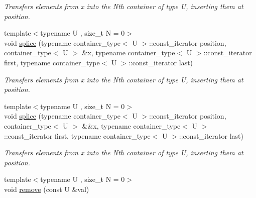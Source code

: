 \begin{DoxyCompactItemize}
\begin{DoxyCompactList}\small\item\em Transfers elements from x into the Nth container of type U, inserting them at position. \end{DoxyCompactList}\item 
\hypertarget{classheterogeneous_1_1heterolist_3_01_t_00_01_types_8_8_8_4_a9c8929311e56974b00402dace18f0bab}{}{\footnotesize template$<$typename U , size\+\_\+t N = 0$>$ }\\void \hyperlink{classheterogeneous_1_1heterolist_3_01_t_00_01_types_8_8_8_4_a9c8929311e56974b00402dace18f0bab}{splice} (typename container\+\_\+type$<$ U $>$\+::const\+\_\+iterator position, container\+\_\+type$<$ U $>$ \&x, typename container\+\_\+type$<$ U $>$\+::const\+\_\+iterator first, typename container\+\_\+type$<$ U $>$\+::const\+\_\+iterator last)\label{classheterogeneous_1_1heterolist_3_01_t_00_01_types_8_8_8_4_a9c8929311e56974b00402dace18f0bab}

\begin{DoxyCompactList}\small\item\em Transfers elements from x into the Nth container of type U, inserting them at position. \end{DoxyCompactList}\item 
\hypertarget{classheterogeneous_1_1heterolist_3_01_t_00_01_types_8_8_8_4_a54dfedba2225a5d57da1f3a80428d237}{}{\footnotesize template$<$typename U , size\+\_\+t N = 0$>$ }\\void \hyperlink{classheterogeneous_1_1heterolist_3_01_t_00_01_types_8_8_8_4_a54dfedba2225a5d57da1f3a80428d237}{splice} (typename container\+\_\+type$<$ U $>$\+::const\+\_\+iterator position, container\+\_\+type$<$ U $>$ \&\&x, typename container\+\_\+type$<$ U $>$\+::const\+\_\+iterator first, typename container\+\_\+type$<$ U $>$\+::const\+\_\+iterator last)\label{classheterogeneous_1_1heterolist_3_01_t_00_01_types_8_8_8_4_a54dfedba2225a5d57da1f3a80428d237}

\begin{DoxyCompactList}\small\item\em Transfers elements from x into the Nth container of type U, inserting them at position. \end{DoxyCompactList}\item 
\hypertarget{classheterogeneous_1_1heterolist_3_01_t_00_01_types_8_8_8_4_a399927d7359ff2bbcb5885c5761a92f4}{}{\footnotesize template$<$typename U , size\+\_\+t N = 0$>$ }\\void \hyperlink{classheterogeneous_1_1heterolist_3_01_t_00_01_types_8_8_8_4_a399927d7359ff2bbcb5885c5761a92f4}{remove} (const U \&val)\label{classheterogeneous_1_1heterolist_3_01_t_00_01_types_8_8_8_4_a399927d7359ff2bbcb5885c5761a92f4}


\end{DoxyCompactItemize}

